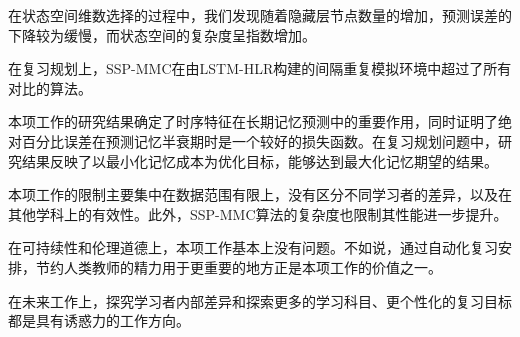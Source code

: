 在状态空间维数选择的过程中，我们发现随着隐藏层节点数量的增加，预测误差的下降较为缓慢，而状态空间的复杂度呈指数增加。

在复习规划上，SSP-MMC在由LSTM-HLR构建的间隔重复模拟环境中超过了所有对比的算法。

本项工作的研究结果确定了时序特征在长期记忆预测中的重要作用，同时证明了绝对百分比误差在预测记忆半衰期时是一个较好的损失函数。在复习规划问题中，研究结果反映了以最小化记忆成本为优化目标，能够达到最大化记忆期望的结果。

本项工作的限制主要集中在数据范围有限上，没有区分不同学习者的差异，以及在其他学科上的有效性。此外，SSP-MMC算法的复杂度也限制其性能进一步提升。

在可持续性和伦理道德上，本项工作基本上没有问题。不如说，通过自动化复习安排，节约人类教师的精力用于更重要的地方正是本项工作的价值之一。

在未来工作上，探究学习者内部差异和探索更多的学习科目、更个性化的复习目标都是具有诱惑力的工作方向。